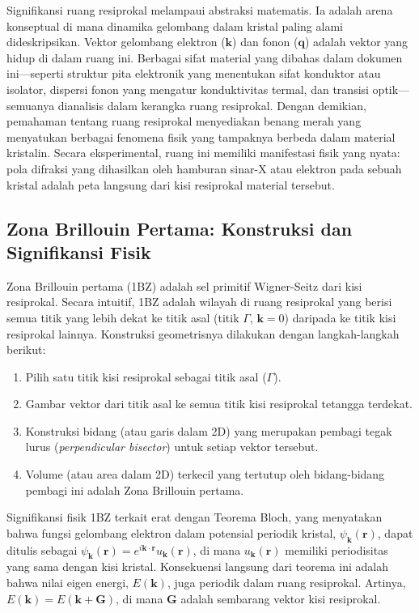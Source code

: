 Signifikansi ruang resiprokal melampaui abstraksi matematis. Ia adalah arena konseptual di mana dinamika gelombang dalam kristal paling alami dideskripsikan. Vektor gelombang elektron ($\mathbf{k}$) dan fonon ($\mathbf{q}$) adalah vektor yang hidup di dalam ruang ini. Berbagai sifat material yang dibahas dalam dokumen ini—seperti struktur pita elektronik yang menentukan sifat konduktor atau isolator, dispersi fonon yang mengatur konduktivitas termal, dan transisi optik—semuanya dianalisis dalam kerangka ruang resiprokal. Dengan demikian, pemahaman tentang ruang resiprokal menyediakan benang merah yang menyatukan berbagai fenomena fisik yang tampaknya berbeda dalam material kristalin. Secara eksperimental, ruang ini memiliki manifestasi fisik yang nyata: pola difraksi yang dihasilkan oleh hamburan sinar-X atau elektron pada sebuah kristal adalah peta langsung dari kisi resiprokal material tersebut.

\subsection{Zona Brillouin Pertama: Konstruksi dan Signifikansi Fisik}
Zona Brillouin pertama (1BZ) adalah sel primitif Wigner-Seitz dari kisi resiprokal. Secara intuitif, 1BZ adalah wilayah di ruang resiprokal yang berisi semua titik yang lebih dekat ke titik asal (titik $\Gamma$, $\mathbf{k}=0$) daripada ke titik kisi resiprokal lainnya. Konstruksi geometrisnya dilakukan dengan langkah-langkah berikut:
\begin{enumerate}
    \item Pilih satu titik kisi resiprokal sebagai titik asal ($\Gamma$).
    \item Gambar vektor dari titik asal ke semua titik kisi resiprokal tetangga terdekat.
    \item Konstruksi bidang (atau garis dalam 2D) yang merupakan pembagi tegak lurus (\emph{perpendicular bisector}) untuk setiap vektor tersebut.
    \item Volume (atau area dalam 2D) terkecil yang tertutup oleh bidang-bidang pembagi ini adalah Zona Brillouin pertama.
\end{enumerate}

Signifikansi fisik 1BZ terkait erat dengan Teorema Bloch, yang menyatakan bahwa fungsi gelombang elektron dalam potensial periodik kristal, $\psi_{\mathbf{k}}(\mathbf{r})$, dapat ditulis sebagai $\psi_{\mathbf{k}}(\mathbf{r}) = e^{i\mathbf{k}\cdot\mathbf{r}} u_{\mathbf{k}}(\mathbf{r})$, di mana $u_{\mathbf{k}}(\mathbf{r})$ memiliki periodisitas yang sama dengan kisi kristal. Konsekuensi langsung dari teorema ini adalah bahwa nilai eigen energi, $E(\mathbf{k})$, juga periodik dalam ruang resiprokal. Artinya, $E(\mathbf{k}) = E(\mathbf{k} + \mathbf{G})$, di mana $\mathbf{G}$ adalah sembarang vektor kisi resiprokal.

